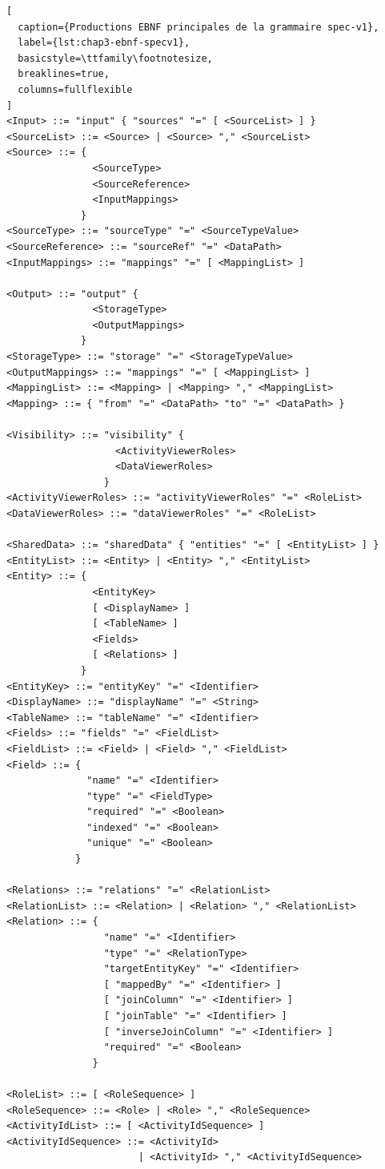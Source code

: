 \begin{lstlisting}[
  caption={Productions EBNF principales de la grammaire spec-v1},
  label={lst:chap3-ebnf-specv1},
  basicstyle=\ttfamily\footnotesize,
  breaklines=true,
  columns=fullflexible
]
<Input> ::= "input" { "sources" "=" [ <SourceList> ] }
<SourceList> ::= <Source> | <Source> "," <SourceList>
<Source> ::= {
               <SourceType>
               <SourceReference>
               <InputMappings>
             }
<SourceType> ::= "sourceType" "=" <SourceTypeValue>
<SourceReference> ::= "sourceRef" "=" <DataPath>
<InputMappings> ::= "mappings" "=" [ <MappingList> ]

<Output> ::= "output" {
               <StorageType>
               <OutputMappings>
             }
<StorageType> ::= "storage" "=" <StorageTypeValue>
<OutputMappings> ::= "mappings" "=" [ <MappingList> ]
<MappingList> ::= <Mapping> | <Mapping> "," <MappingList>
<Mapping> ::= { "from" "=" <DataPath> "to" "=" <DataPath> }

<Visibility> ::= "visibility" {
                   <ActivityViewerRoles>
                   <DataViewerRoles>
                 }
<ActivityViewerRoles> ::= "activityViewerRoles" "=" <RoleList>
<DataViewerRoles> ::= "dataViewerRoles" "=" <RoleList>

<SharedData> ::= "sharedData" { "entities" "=" [ <EntityList> ] }
<EntityList> ::= <Entity> | <Entity> "," <EntityList>
<Entity> ::= {
               <EntityKey>
               [ <DisplayName> ]
               [ <TableName> ]
               <Fields>
               [ <Relations> ]
             }
<EntityKey> ::= "entityKey" "=" <Identifier>
<DisplayName> ::= "displayName" "=" <String>
<TableName> ::= "tableName" "=" <Identifier>
<Fields> ::= "fields" "=" <FieldList>
<FieldList> ::= <Field> | <Field> "," <FieldList>
<Field> ::= {
              "name" "=" <Identifier>
              "type" "=" <FieldType>
              "required" "=" <Boolean>
              "indexed" "=" <Boolean>
              "unique" "=" <Boolean>
            }

<Relations> ::= "relations" "=" <RelationList>
<RelationList> ::= <Relation> | <Relation> "," <RelationList>
<Relation> ::= {
                 "name" "=" <Identifier>
                 "type" "=" <RelationType>
                 "targetEntityKey" "=" <Identifier>
                 [ "mappedBy" "=" <Identifier> ]
                 [ "joinColumn" "=" <Identifier> ]
                 [ "joinTable" "=" <Identifier> ]
                 [ "inverseJoinColumn" "=" <Identifier> ]
                 "required" "=" <Boolean>
               }

<RoleList> ::= [ <RoleSequence> ]
<RoleSequence> ::= <Role> | <Role> "," <RoleSequence>
<ActivityIdList> ::= [ <ActivityIdSequence> ]
<ActivityIdSequence> ::= <ActivityId>
                       | <ActivityId> "," <ActivityIdSequence>


\end{lstlisting}
